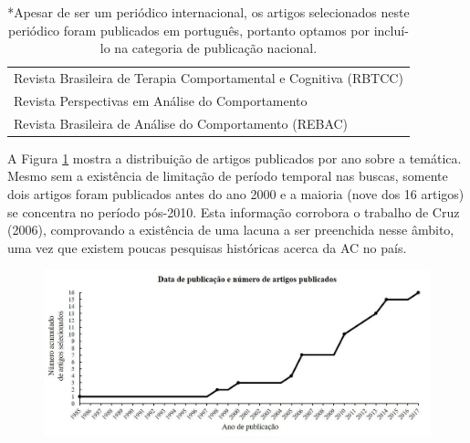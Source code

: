 \begin{table}[tbp]
\begin{adjustbox}{max width=1\textwidth}
\begin{tabular}{@{}l@{}}
    Revista Brasileira de Terapia Comportamental e Cognitiva (RBTCC)                \\
    Revista Perspectivas em Análise do Comportamento                                \\
    Revista Brasileira de Análise do Comportamento (REBAC)                          \\ \bottomrule
    \end{tabular}
    \end{adjustbox}
    \caption*{*Apesar de ser um periódico internacional, os artigos selecionados neste periódico foram publicados em português, portanto optamos por incluí-lo na categoria de publicação nacional.}
    \end{table}

A Figura \ref{figura011} mostra a distribuição de artigos publicados por ano sobre a temática. Mesmo sem a existência de limitação de período temporal nas buscas, somente dois artigos foram publicados antes do ano 2000 e a maioria (nove dos 16 artigos) se concentra no período pós-2010. Esta informação corrobora o trabalho de Cruz (2006), comprovando a existência de uma lacuna a ser preenchida nesse âmbito, uma vez que existem poucas pesquisas históricas acerca da AC no país.

\begin{figure}[ht]
\includegraphics[width=1\textwidth]{1/figura1}
\label{figura011}
\end{figure}

